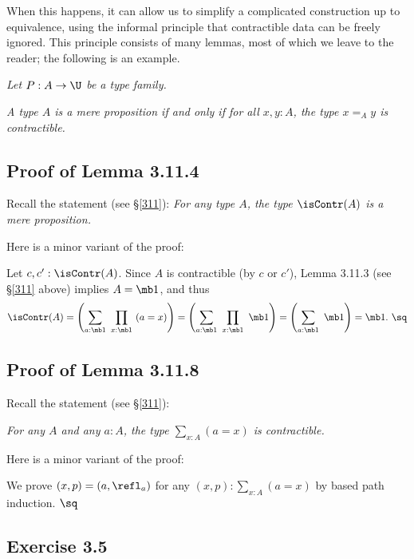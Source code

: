 \documentclass[12pt]{article}
\begin{document}
When this happens, it can allow us to simplify a complicated construction up to equivalence, using the informal principle that contractible data can be freely ignored. This principle consists of many lemmas, most of which we leave to the reader; the following is an example.

\nn{} \emph{Let $P:A\to\U$ be a type family.}

\nn{} \emph{A type $A$ is a mere proposition if and only if for all $x,y:A$, the type $x=_Ay$ is contractible.}


\subsection{Proof of Lemma 3.11.4} 

Recall the statement (see \S\ref{311}): \emph{For any type $A$, the type $\isContr(A)$ is a mere proposition.}

Here is a minor variant of the proof:

Let $c,c':\isContr(A)$. Since $A$ is contractible (by $c$ or $c'$), Lemma 3.11.3 (see \S\ref{311} above) implies $A=\mb1$, and thus 
$$
\isContr(A)=\left(\sum_{a:\mb1}\ \prod_{x:\mb1}\ (a=x)\right)=\left(\sum_{a:\mb1}\ \prod_{x:\mb1}\ \mb1\right)=\left(\sum_{a:\mb1}\ \mb1\right)=\mb1.\ \sq
$$


\subsection{Proof of Lemma 3.11.8} 

Recall the statement (see \S\ref{311}): 

\nn\emph{For any $A$ and any $a:A$, the type $\sum_{x:A}(a=x)$ is contractible.}

Here is a minor variant of the proof:

We prove $(x,p)=(a,\refl_a)$ for any $(x,p):\sum_{x:A}(a=x)$ by based path induction. $\sq$


\subsection{Exercise 3.5}
\end{document}
